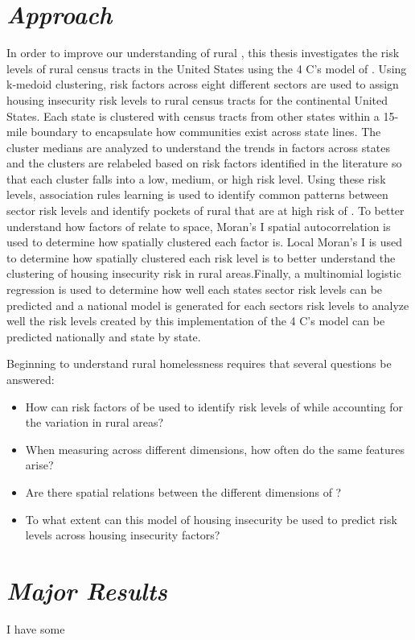 \section{\textit{Approach}}
In order to improve our understanding of rural \hs, this thesis investigates the risk levels of rural census tracts in the United States  using the 4 C's model of \hs. Using k-medoid clustering, risk factors across eight different sectors are used to assign housing insecurity risk levels to rural census tracts for the continental United States. Each state is clustered with census tracts from other states within a 15-mile boundary to encapsulate how communities exist across state lines. The cluster medians are analyzed to understand the trends in \hs factors across states and the clusters are relabeled based on risk factors identified in the literature so that each cluster falls into a low, medium, or high risk level. Using these risk levels, association rules learning is used to identify common patterns between sector risk levels and identify pockets of rural \ct that are at high risk of \hs. To better understand how factors of \hs relate to space, Moran's I spatial autocorrelation is used to determine how spatially clustered each \hs factor is. Local Moran's I is used to determine how spatially clustered each risk level is to better understand the clustering of housing insecurity risk in rural areas.Finally, a multinomial logistic regression is used to determine how well each states sector risk levels can be predicted and a national model is generated for each sectors risk levels to analyze well the risk levels created by this implementation of the 4 C's model can be predicted nationally and state by state. 

Beginning to understand rural homelessness requires that several questions be answered:
\begin{itemize}
    \item How can risk factors of be used to identify risk levels of \hs while accounting for the variation in rural areas? 
    \item When measuring \hs across different dimensions, how often do the same features arise?
    \item Are there spatial relations between the different dimensions of \hs? 
    \item To what extent can this model of housing insecurity be used to predict risk levels across housing insecurity factors?

\end{itemize}
\section{\textit{Major Results}}
I have some

